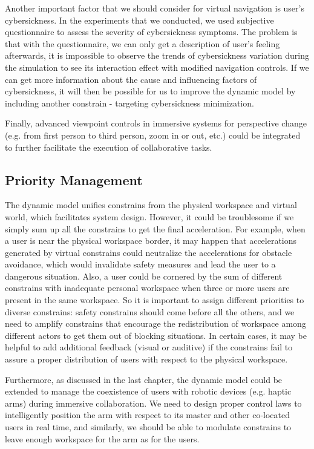 Another important factor that we should consider for virtual navigation is user's cybersickness. In the experiments that we conducted, we used subjective questionnaire to assess the severity of cybersickness symptoms. The problem is that with the questionnaire, we can only get a description of user's feeling afterwards, it is impossible to observe the trends of cybersickness variation during the simulation to see its interaction effect with modified navigation controls. If we can get more information about the cause and influencing factors of cybersickness, it will then be possible for us to improve the dynamic model by including another constrain - targeting cybersickness minimization.

Finally, advanced viewpoint controls in immersive systems for perspective change (e.g. from first person to third person, zoom in or out, etc.) could be integrated to further facilitate the execution of collaborative tasks.

\subsection*{Priority Management}
The dynamic model unifies constrains from the physical workspace and virtual world, which facilitates system design. However, it could be troublesome if we simply sum up all the constrains to get the final acceleration. For example, when a user is near the physical workspace border, it may happen that accelerations generated by virtual constrains could neutralize the accelerations for obstacle avoidance, which would invalidate safety measures and lead the user to a dangerous situation. Also, a user could be cornered by the sum of different constrains with inadequate personal workspace when three or more users are present in the same workspace. So it is important to assign different priorities to diverse constrains: safety constrains should come before all the others, and we need to amplify constrains that encourage the redistribution of workspace among different actors to get them out of blocking situations. In certain cases, it may be helpful to add additional feedback (visual or auditive) if the constrains fail to assure a proper distribution of users with respect to the physical workspace.

Furthermore, as discussed in the last chapter, the dynamic model could be extended to manage the coexistence of users with robotic devices (e.g. haptic arms) during immersive collaboration. We need to design proper control laws to intelligently position the arm with respect to its master and other co-located users in real time, and similarly, we should be able to modulate constrains to leave enough workspace for the arm as for the users.

